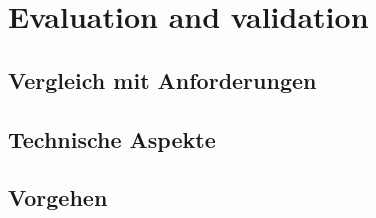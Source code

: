 \chapter{Evaluation and validation}
\label{ch:Eval}

\section{Vergleich mit Anforderungen}
\label{sec:VergleichAnforderungen}

\section{Technische Aspekte}

\section{Vorgehen}
